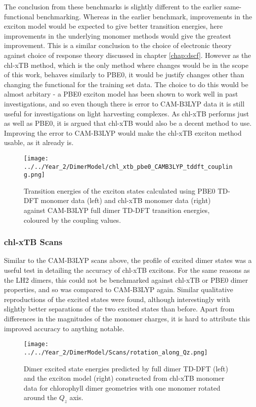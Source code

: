 The conclusion from these benchmarks is slightly different to the earlier same-functional
benchmarking. Whereas in the earlier benchmark, improvements in the exciton model
would be expected to give better transition energies, here improvements in the underlying
monomer methods would give the greatest improvement. This is a similar conclusion
to the choice of electronic theory against choice of response theory discussed in
chapter \ref{chap:dscf}. However as the chl-xTB method, which is the only method
where changes would be in the scope of this work, behaves similarly to PBE0, it 
would be justify changes other than changing the functional for the training set
data. The choice to do this would be almost arbitary - a PBE0 exciton model has
been shown to work well in past investigations, and so even though there is error
to CAM-B3LYP data it is still useful for investigations on light harvesting complexes.
As chl-xTB performs just as well as PBE0, it is argued that chl-xTB would also be
a decent method to use. Improving the error to CAM-B3LYP would make the chl-xTB
exciton method usable, as it already is. 

\begin{figure}
    \centering
    \texttt{[image: ../../Year\_2/DimerModel/chl\_xtb\_pbe0\_CAMB3LYP\_tddft\_coupling.png]}
    \label{fig:chl_xtb_pbe0_LH2}
    \caption{Transition energies of the exciton states calculated using PBE0 TD-DFT
    monomer data (left) and chl-xTB monomer data (right) against CAM-B3LYP full
    dimer TD-DFT transition energies, coloured by the coupling values.}
\end{figure}

\subsubsection{chl-xTB Scans}
\label{subsubsec:chl_xtb_scans}

Similar to the CAM-B3LYP scans above, the profile of excited dimer states was a useful
test in detailing the accuracy of chl-xTB excitons. For the same reasons as the
LH2 dimers, this could not be benchmarked against chl-xTB or PBE0 dimer properties,
and so was compared to CAM-B3LYP again. Similar qualitative reproductions of the
excited states were found, although interestingly with slightly better separations
of the two excited states than before. Apart from differences in the magnitudes 
of the monomer charges, it is hard to attribute this improved accuracy to anything
notable.

\begin{figure}
    \centering
    \texttt{[image: ../../Year\_2/DimerModel/Scans/rotation\_along\_Qz.png]}
    \label{fig:chl_xtb_rot_Qz}
    \caption{Dimer excited state energies predicted by full dimer TD-DFT (left)
    and the exciton model (right) constructed from chl-xTB monomer data for chlorophyll 
    dimer geometries with one monomer rotated around the $Q_z$ axis.}
\end{figure}

